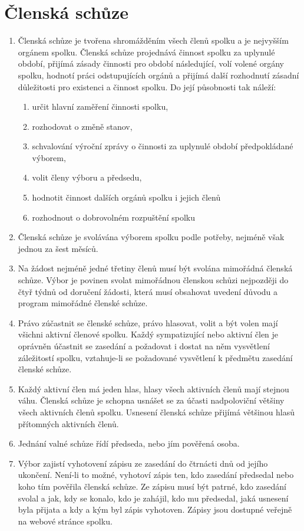 \documentclass[11pt]{article}
\begin{document}
\section{Členská schůze}
\begin{enumerate}
\item Členská schůze je tvořena shromážděním všech členů spolku a je nejvyšším orgánem spolku. Členská schůze projednává činnost spolku za uplynulé období, přijímá zásady činnosti pro období následující, volí volené orgány spolku, hodnotí práci odstupujících orgánů a přijímá další rozhodnutí zásadní důležitosti pro existenci a činnost spolku. Do její působnosti tak náleží: 
\begin{enumerate}
\item určit hlavní zaměření činnosti spolku,
\item rozhodovat o změně stanov,
\item schvalování výroční zprávy o činnosti za uplynulé období předpokládané výborem,
\item volit členy výboru a předsedu,
\item hodnotit činnost dalších orgánů spolku i jejich členů 
\item rozhodnout o dobrovolném rozpuštění spolku 
\end{enumerate}
\item Členská schůze je svolávána výborem spolku podle potřeby, nejméně však jednou za šest měsíců.
\item Na žádost nejméně jedné třetiny členů musí být svolána mimořádná členská schůze. Výbor je povinen svolat mimořádnou členskou schůzi nejpozději do čtyř týdnů od doručení žádosti, která musí obsahovat uvedení důvodu a program mimořádné členské schůze.
\item Právo zúčastnit se členské schůze, právo hlasovat, volit a být volen mají všichni aktivní členové spolku. Každý sympatizující nebo aktivní člen je oprávněn účastnit se zasedání a požadovat i dostat na něm vysvětlení záležitostí spolku, vztahuje-li se požadované vysvětlení k předmětu zasedání členské schůze.
\item Každý aktivní člen má jeden hlas, hlasy všech aktivních členů mají stejnou váhu. Členská schůze je schopna usnášet se za účasti nadpoloviční většiny všech aktivních členů spolku. Usnesení členská schůze přijímá většinou hlasů přítomných aktivních členů. 
\item Jednání valné schůze řídí předseda, nebo jím pověřená osoba.
\item Výbor zajistí vyhotovení zápisu ze zasedání do čtrnácti dnů od jejího ukončení. Není-li to možné, vyhotoví zápis ten, kdo zasedání předsedal nebo koho tím pověřila členská schůze. Ze zápisu musí být patrné, kdo zasedání svolal a jak, kdy se konalo, kdo je zahájil, kdo mu předsedal, jaká usnesení byla přijata a kdy a kým byl zápis vyhotoven. Zápisy jsou dostupné veřejně na webové stránce spolku.
\end{enumerate}
\end{document}
